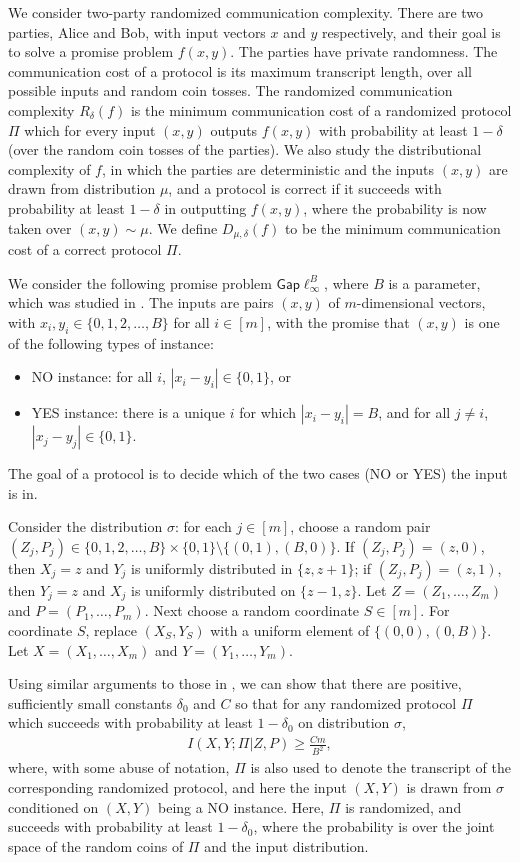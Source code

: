 \documentclass[twoside,leqno,twocolumn]{article}
\newcommand{\gaplinf}{\mathsf{Gap}\ell_{\infty}}
\begin{document}
We consider two-party randomized communication complexity. There are two parties,
Alice and Bob, with input vectors $x$ and $y$ respectively, and their goal is
to solve a promise problem $f(x,y)$. The parties have private randomness. 
The communication cost of a protocol is
its maximum transcript length, over all possible inputs and random coin tosses.
The randomized communication complexity $R_{\delta}(f)$ is 
the minimum communication cost of a randomized protocol $\Pi$ which for every input
$(x,y)$ outputs $f(x,y)$ with probability at least $1-\delta$ (over the random
coin tosses of the parties). We also study the distributional
complexity of $f$, in which the parties are deterministic and
the inputs $(x,y)$ are drawn from distribution $\mu$, and a protocol is
correct if it succeeds with probability at least $1-\delta$ in outputting $f(x,y)$,
where the probability is now taken over $(x,y) \sim \mu$. We define $D_{\mu, \delta}(f)$
to be the minimum communication cost of a correct protocol $\Pi$. 

We consider the following promise problem 
$\gaplinf^B$, where $B$ is a parameter, 
which was studied in \cite{ss02,BJKS04}. The
inputs are pairs $(x,y)$ of $m$-dimensional vectors, with
$x_i, y_i \in \{0, 1, 2, \ldots, B\}$ for all $i \in [m]$, with the promise that 
$(x,y)$ is one of the following types of instance:
\begin{itemize}
\item NO instance: for all $i$, $|x_i-y_i| \in \{0,1\}$, or
\item YES instance: there is a unique $i$ for which
  $|x_i-y_i| = B$, and for all $j \neq i$, $|x_j-y_j| \in \{0,1\}$.
\end{itemize}
The goal of a protocol is to decide which of the two cases (NO or YES) the input
is in. 


Consider the distribution $\sigma$: for each $j \in
[m]$, choose a random pair $(Z_j, P_j) \in \{0, 1, 2, \ldots, B\} \times \{0,1\}
\setminus \{(0,1), (B, 0)\}$. If $(Z_j, P_j) = (z, 0)$, then $X_j = z$ and 
$Y_j$ is uniformly distributed in $\{z, z+1\}$; if $(Z_j, P_j) = (z, 1)$, then $Y_j = z$
and $X_j$ is uniformly distributed on $\{z-1, z\}$. 
Let $Z = (Z_1, \ldots, Z_m)$ and $P = (P_1, \ldots, P_m)$. 
Next choose a random coordinate $S \in [m]$. 
For coordinate $S$, replace $(X_{S}, Y_{S})$ with a uniform element of 
$\{(0,0), (0,B)\}$.  Let $X = (X_1, \ldots, X_m)$ and $Y =
(Y_1, \ldots, Y_m)$.

Using similar arguments to those in \cite{BJKS04}, 
we can show that there are positive, sufficiently small 
constants $\delta_0$ and $C$ so that
for any randomized protocol $\Pi$ which succeeds with probability at
least $1-\delta_0$ on distribution $\sigma$,
\begin{eqnarray}\label{eqn:icost}
I(X, Y ; \Pi | Z, P) \geq \frac{Cm}{B^2},
\end{eqnarray}
where, with some abuse of notation, 
$\Pi$ is also used to denote the transcript of the corresponding randomized protocol,
and here the input $(X,Y)$ is drawn
from $\sigma$ conditioned on $(X,Y)$ being a NO instance. 
Here, $\Pi$ is randomized, and succeeds with probability at least $1-\delta_0$,
where the probability is over the joint space of the random coins of
$\Pi$ and the input distribution.
\end{document}
